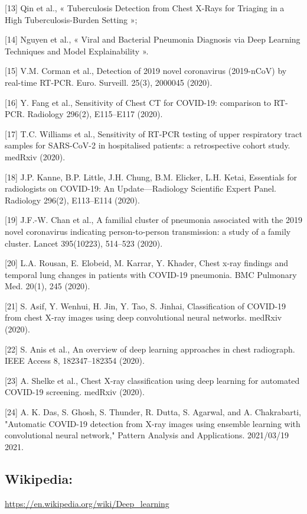 \documentclass[12pt]{report}
\begin{document}
    [13]    Qin et al., « Tuberculosis Detection from Chest X-Rays for Triaging in a High Tuberculosis-Burden Setting »;
    
    [14]    Nguyen et al., « Viral and Bacterial Pneumonia Diagnosis via Deep Learning Techniques and Model Explainability ».

    [15]    V.M. Corman et al., Detection of 2019 novel coronavirus (2019-nCoV) by real-time RT-PCR. Euro. Surveill. 25(3), 2000045 (2020).
    
    [16]    Y. Fang et al., Sensitivity of Chest CT for COVID-19: comparison to RT-PCR. Radiology 296(2), E115–E117 (2020).

    [17]    T.C. Williams et al., Sensitivity of RT-PCR testing of upper respiratory tract samples for SARS-CoV-2 in hospitalised patients: a retrospective cohort study. medRxiv (2020).

    [18]    J.P. Kanne, B.P. Little, J.H. Chung, B.M. Elicker, L.H. Ketai, Essentials for radiologists on COVID-19: An Update—Radiology Scientific Expert Panel. Radiology 296(2), E113–E114 (2020).

    [19]    J.F.-W. Chan et al., A familial cluster of pneumonia associated with the 2019 novel coronavirus indicating person-to-person transmission: a study of a family cluster. Lancet 395(10223), 514–523 (2020).

    [20]    L.A. Rousan, E. Elobeid, M. Karrar, Y. Khader, Chest x-ray findings and temporal lung changes in patients with COVID-19 pneumonia. BMC Pulmonary Med. 20(1), 245 (2020).

    [21]    S. Asif, Y. Wenhui, H. Jin, Y. Tao, S. Jinhai, Classification of COVID-19 from chest X-ray images using deep convolutional neural networks. medRxiv (2020).

    [22]    S. Anis et al., An overview of deep learning approaches in chest radiograph. IEEE Access 8, 182347–182354 (2020).

    [23]    A. Shelke et al., Chest X-ray classification using deep learning for automated COVID-19 screening. medRxiv (2020).

    [24]    A. K. Das, S. Ghosh, S. Thunder, R. Dutta, S. Agarwal, and A. Chakrabarti, "Automatic COVID-19 detection from X-ray images using ensemble learning with convolutional neural network," Pattern Analysis and Applications. 2021/03/19 2021. 

    \subsection*{Wikipedia: }
    \url{https://en.wikipedia.org/wiki/Deep_learning}
\end{document}
